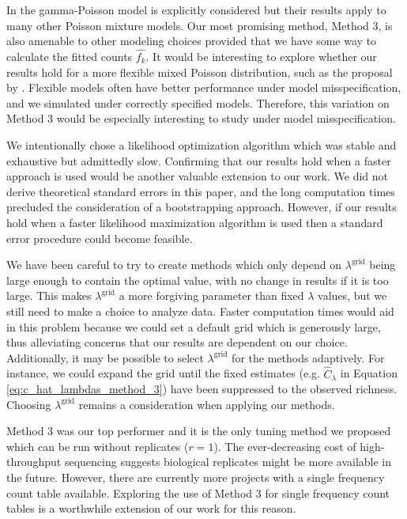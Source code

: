 \documentclass[oupdraft]{bio}
\newcommand{\lambdagrid}{\lambda^{\text{grid}}}
\begin{document}
In \citet{wang_2005} the gamma-Poisson model is explicitly considered but their results apply to many other Poisson mixture models.  Our most promising method, Method 3, is also amenable to other modeling choices provided that we have some way to calculate the fitted counts $\widehat{f_k}$.  It would be interesting to explore whether our results hold for a more flexible mixed Poisson distribution, such as the proposal by \citet{norris_1998}.  Flexible models often have better performance under model misspecification, and we simulated under correctly specified models.  Therefore, this variation on  Method 3 would be especially interesting to study under model misspecification.

We intentionally chose a likelihood optimization algorithm which was stable and exhaustive but admittedly slow.  Confirming that our results hold when a faster approach is used would be another valuable extension to our work. We did not derive theoretical standard errors in this paper, and the long computation times precluded the consideration of a bootstrapping approach.  However, if our results hold when a faster likelihood maximization algorithm is used then a standard error procedure could become feasible.

We have been careful to try to create methods which only depend on $\lambdagrid$ being large enough to contain the optimal value, with no change in results if it is too large.  This makes $\lambdagrid$ a more forgiving parameter than fixed $\lambda$ values, but we still need to make a choice to analyze data.  Faster computation times would aid in this problem because we could set a default grid which is generously large, thus alleviating concerns that our results are dependent on our choice.  Additionally, it may be possible to select $\lambdagrid$ for the methods adaptively.  For instance, we could expand the grid until the fixed estimates (e.g. $\widehat{C}_{\lambda}$ in Equation \eqref{eq:c_hat_lambdas_method_3}) have been suppressed to the observed richness.  Choosing $\lambdagrid$ remains a consideration when applying our methods.

Method 3 was our top performer and it is the only tuning method we proposed which can be run without replicates ($r = 1$).  The ever-decreasing cost of high-throughput sequencing suggests biological replicates might be more available in the future.  However, there are currently more projects with a single frequency count table available.  Exploring the use of Method 3 for single frequency count tables is a worthwhile extension of our work for this reason.
\end{document}
